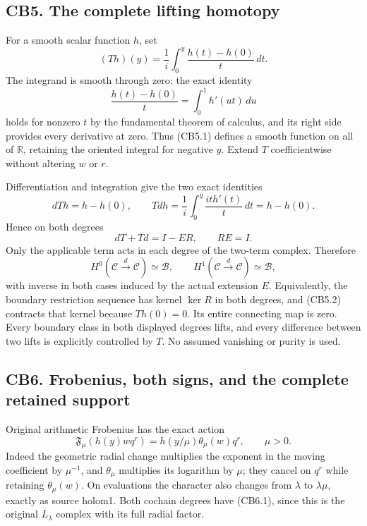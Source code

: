 \subsection{CB5. The complete lifting
homotopy}\label{cb5.-the-complete-lifting-homotopy}

For a smooth scalar function \(h\), set \[
(Th)(y)=\frac1i\int_0^y\frac{h(t)-h(0)}{t}\,dt.
\tag{CB5.1}
\] The integrand is smooth through zero: the exact identity \[
\frac{h(t)-h(0)}{t}=\int_0^1h'(ut)\,du
\] holds for nonzero \(t\) by the fundamental theorem of calculus, and
its right side provides every derivative at zero. Thus (CB5.1) defines a
smooth function on all of \(\mathbb R\), retaining the oriented integral
for negative \(y\). Extend \(T\) coefficientwise without altering \(w\)
or \(r\).

Differentiation and integration give the two exact identities \[
dT h=h-h(0),\qquad
Td h=\frac1i\int_0^y\frac{it h'(t)}t\,dt=h-h(0).
\tag{CB5.2}
\] Hence on both degrees \[
\boxed{dT+Td=I-ER,\qquad RE=I.}
\tag{CB5.3}
\] Only the applicable term acts in each degree of the two-term complex.
Therefore \[
H^0(\mathcal C\xrightarrow d\mathcal C)\simeq\mathcal B,
\qquad H^1(\mathcal C\xrightarrow d\mathcal C)\simeq\mathcal B,
\tag{CB5.4}
\] with inverse in both cases induced by the actual extension \(E\).
Equivalently, the boundary restriction sequence has kernel \(\ker R\) in
both degrees, and (CB5.2) contracts that kernel because \(Th(0)=0\). Its
entire connecting map is zero. Every boundary class in both displayed
degrees lifts, and every difference between two lifts is explicitly
controlled by \(T\). No assumed vanishing or purity is used.

\subsection{CB6. Frobenius, both signs, and the complete retained
support}\label{cb6.-frobenius-both-signs-and-the-complete-retained-support}

Original arithmetic Frobenius has the exact action \[
\mathfrak F_\mu(h(y)wq^r)
=h(y/\mu)\theta_\mu(w)q^r,
\qquad \mu>0.
\tag{CB6.1}
\] Indeed the geometric radial change multiplies the exponent in the
moving coefficient by \(\mu^{-1}\), and \(\theta_\mu\) multiplies its
logarithm by \(\mu\); they cancel on \(q^r\) while retaining
\(\theta_\mu(w)\). On evaluations the character also changes from
\(\lambda\) to \(\lambda\mu\), exactly as source holom1. Both cochain
degrees have (CB6.1), since this is the original \(L_\lambda\) complex
with its full radial factor.

